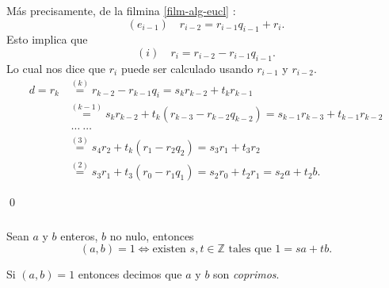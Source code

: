 \documentclass[handout]{beamer} %
\begin{document}
    
    \begin{frame}\label{fil-obtencion-de-r-s}
        
    Más precisamente, de la filmina \ref{film-alg-eucl} :
    \begin{equation*}
        (e_{i-1})\quad r_{i-2}=r_{i-1}q_{i-1} + r_{i}.
    \end{equation*}\pause
        Esto implica que 
        $$
        ({i})\quad r_{i} = r_{i-2} - r_{i-1}q_{i-1}.
        $$\pause
        Lo cual nos dice que $r_{i}$  puede ser calculado usando $r_{i-1}$ y $r_{i-2}$.
        \pause
        \begin{align*}
            d = r_{k} &\stackrel{(k)}{=} r_{k-2}-r_{k-1}q_{i} = s_kr_{k-2}+ t_k r_{k-1} \\
            &\stackrel{(k-1)}{=} s_kr_{k-2}+ t_k (r_{k-3}-r_{k-2}q_{k-2}) =s_{k-1}r_{k-3}+ t_{k-1} r_{k-2} \\
            &\;\cdots\;\cdots\\
            &\stackrel{(3)}{=} s_4r_{2}+ t_k (r_{1}-r_{2}q_{2}) =s_{3}r_{1}+ t_{3} r_{2} \\
            &\stackrel{(2)}{=} s_3r_{1}+ t_3 (r_{0}-r_{1}q_{1}) =s_{2}r_{0}+ t_{2} r_{1} =s_{2}a+ t_{2}b.
        \end{align*}
        
        \qed
        
    \end{frame}


    \begin{frame}
        \frametitle{}

        \begin{corolario}
            Sean $a$ y $b$ enteros, $b$ no nulo, entonces
            $$
            (a,b) = 1 \Leftrightarrow \text{existen $s,t \in \mathbb Z$ tales que $1 = sa+tb$.}
            $$
        \end{corolario}
        \pause
        
    \begin{definicion}
        Si  $(a,b)=1$ entonces decimos que $a$ y $ b$ son {\em coprimos}.
    \end{definicion}


        
        
    
    \end{frame}
\end{document}
